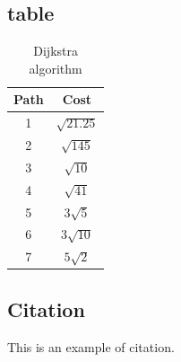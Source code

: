 \subsection{table}

\begin{table}[H]
\begin{center}
    \begin{tabular}{@{} c  c @{}}
    \toprule
    Path          & Cost                                        \\
    \midrule
    1               & $\sqrt{21.25}$                            \\
    2               & $\sqrt{145}$                              \\
    3               & $\sqrt{10}$                               \\
    4               & $\sqrt{41}$                               \\
    5               & $3\sqrt{5}$                               \\
    6               & $3\sqrt{10}$                              \\
    7               & $5\sqrt{2}$                               \\
    \bottomrule
    \end{tabular}%
    
\caption{Dijkstra algorithm}
\label{Dijkstra_2}
\end{center}
\end{table}

\subsection{Citation}

This is an example of citation\cite{dijkstra1959note}.

